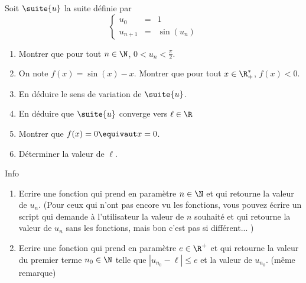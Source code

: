 



\begin{exercice}
Soit $\suite{u}$ la suite définie par 
$$\left\{ 
\begin{array}{ccl}
u_0&=&1\\
u_{n+1} &=& \sin(u_n)
\end{array}
\right.$$

\begin{enumerate}
\item Montrer que pour tout $n\in \N$, $0<u_n<\frac{\pi}{2}$.
\item On note $f(x) = \sin(x)-x$. Montrer que pour tout $x\in \R_+^*$, $f(x)<0.$
\item En déduire le sens de variation de $\suite{u}$.
\item En déduire que $\suite{u}$ converge vers $\ell \in \R$
\item  Montrer que $f(x)=0 \equivaut x=0$.
\item Déterminer la valeur de $\ell$. 
\end{enumerate}

Info 
\begin{enumerate}
\item Ecrire une fonction qui prend en paramètre $n\in \N$ et qui retourne la valeur de $u_n$. (Pour ceux qui n'ont pas encore vu les fonctions, vous pouvez écrire un script qui demande à l'utilisateur la valeur de $n$ souhaité et qui retourne la valeur de $u_n$ sans les fonctions, mais bon c'est pas si différent... ) 
\item 
Ecrire une fonction qui prend en paramètre $e\in \R^+$ et qui retourne la valeur du premier terme $n_0\in \N$ telle que $|u_{n_0}-\ell| \leq e$ et la valeur de $u_{n_0}$. (même remarque) 
\end{enumerate}

\end{exercice}

